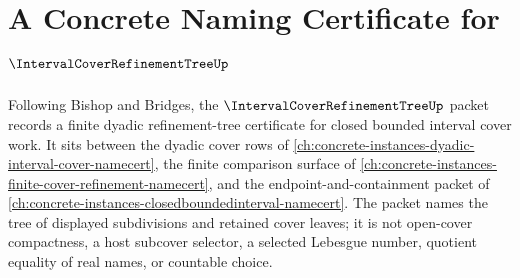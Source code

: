 \chapter{A Concrete Naming Certificate for $\IntervalCoverRefinementTreeUp$}
\label{ch:concrete-instances-interval-cover-refinement-tree-namecert}

Following Bishop and Bridges, the $\IntervalCoverRefinementTreeUp$ packet records a finite dyadic refinement-tree certificate for closed bounded interval cover work. It sits between the dyadic cover rows of \autoref{ch:concrete-instances-dyadic-interval-cover-namecert}, the finite comparison surface of \autoref{ch:concrete-instances-finite-cover-refinement-namecert}, and the endpoint-and-containment packet of \autoref{ch:concrete-instances-closedboundedinterval-namecert}. The packet names the tree of displayed subdivisions and retained cover leaves; it is not open-cover compactness, a host subcover selector, a selected Lebesgue number, quotient equality of real names, or countable choice.

